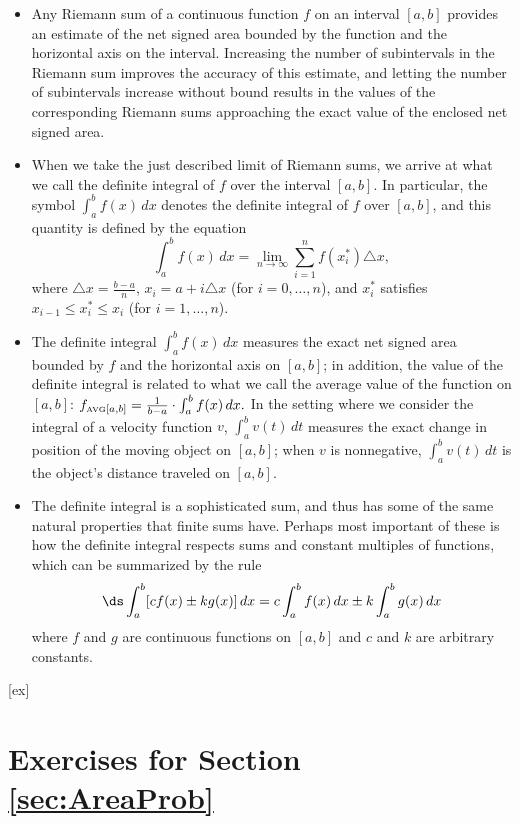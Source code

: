 \begin{itemize}
\item Any Riemann sum of a continuous function $f$ on an interval $[a,b]$ provides an estimate of the net signed area bounded by the function and the horizontal axis on the interval.  Increasing the number of subintervals in the Riemann sum improves the accuracy of this estimate, and letting the number of subintervals increase without bound results in the values of the corresponding Riemann sums approaching the exact value of the enclosed net signed area.
\item When we take the just described limit of Riemann sums, we arrive at what we call the definite integral of $f$ over the interval $[a,b]$.  In particular, the symbol $\int_a^b f(x) \, dx$ denotes the definite integral of $f$ over $[a,b]$, and this quantity is defined by the equation
$$\int_a^b f(x) \, dx = \lim_{n \to \infty} \sum_{i=1}^{n} f(x_i^*) \triangle x,$$
where $\triangle x = \frac{b-a}{n}$, $x_i = a + i\triangle x$ (for $i = 0, \ldots, n$), and $x_i^*$ satisfies $x_{i-1} \le x_i^* \le x_i$ (for $i = 1, \ldots, n$).
\item The definite integral $\int_a^b f(x) \,dx$ measures the exact net signed area bounded by $f$ and the horizontal axis on $[a,b]$; in addition, the value of the definite integral is related to what we call the average value of the function on $[a,b]$: $f_{\mbox{\tiny{AVG}}[a,b]} = \frac{1}{b-a} \cdot \int_a^b f(x) \, dx.$  In the setting where we consider the integral of a velocity function $v$, $\int_a^b v(t) \,dt$ measures the exact change in position of the moving object on $[a,b]$; when $v$ is nonnegative, $\int_a^b v(t) \,dt$ is the object's distance traveled on $[a,b]$.  
\item The definite integral is a sophisticated sum, and thus has some of the same natural properties that finite sums have.  Perhaps most important of these is how the definite integral respects sums and constant multiples of functions, which can be summarized by the rule
$$\ds \int_a^b [c f(x) \pm k g(x)] \,dx = c \int_a^b f(x) \,dx \pm k \int_a^b g(x) \,dx$$
where $f$ and $g$ are continuous functions on $[a,b]$ and $c$ and $k$ are arbitrary constants.
\end{itemize}

[ex]
\section*{Exercises for Section \ref{sec:AreaProb}}

